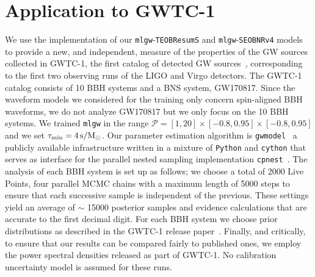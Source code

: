 \documentclass[twocolumn,showpacs,preprintnumbers,nofootinbib,prd,
superscriptaddress,10pt]{revtex4-1}
\begin{document}
\section{Application to GWTC-1}
\label{sec:GWTC1}
We use the implementation of our \texttt{mlgw}-{\tt TEOBResumS} and \texttt{mlgw}-{\tt SEOBNRv4} models 
to provide a new, and independent, measure of the properties of the GW sources
collected in GWTC-1, the first catalog of detected GW sources~\cite{LIGOScientific:2018mvr},
corresponding to the first two observing runs of the LIGO and Virgo detectors.
The GWTC-1 catalog consists of 10 BBH systems and a BNS system, GW170817. 
Since the waveform models we considered for the training only concern spin-aligned
BBH waveforms, we do not analyze GW170817 but we only focus on the 10 BBH systems.
We trained \texttt{mlgw} in the range $\mathcal{P} = [1,20]\times[-0.8,0.95]\times[-0.8,0.95]$ 
and we set $\tau_{\rm min} = \SI{4}{s/M_\odot}$.
Our parameter estimation algorithm is \texttt{gwmodel}~\cite{gwmodel} a publicly available infrastructure 
written in a mixture of \texttt{Python} and \texttt{cython} that serves as interface for the parallel nested 
sampling implementation \texttt{cpnest}~\cite{cpnest}. 
The analysis of each BBH system is set up as follows; we choose a total of 2000 Live Points, 
four parallel MCMC chains with a maximum length of 5000 steps to ensure that each successive 
sample is independent of the previous. These settings yield an average of $\sim$ 15000 posterior samples and 
evidence calculations that are accurate to the first decimal digit. For each BBH system we choose 
prior distributions as described in the GWTC-1 release paper~\cite{LIGOScientific:2018mvr}. Finally, 
and critically, to ensure that our results can be compared fairly to published ones, 
we employ the power spectral densities released as part of GWTC-1. No calibration uncertainty model is assumed for these runs. 
\end{document}
